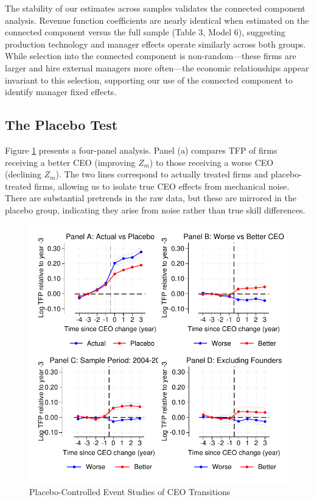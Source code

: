 \documentclass[11pt,a4paper]{article}
\begin{document}


The stability of our estimates across samples validates the connected component analysis. Revenue function coefficients are nearly identical when estimated on the connected component versus the full sample (Table 3, Model 6), suggesting production technology and manager effects operate similarly across both groups. While selection into the connected component is non-random—these firms are larger and hire external managers more often—the economic relationships appear invariant to this selection, supporting our use of the connected component to identify manager fixed effects.

\subsection{The Placebo Test}

Figure \ref{fig:event_study_main} presents a four-panel analysis. Panel (a) compares TFP of firms receiving a better CEO (improving $Z_m$) to those receiving a worse CEO (declining $Z_m$). The two lines correspond to actually treated firms and placebo-treated firms, allowing us to isolate true CEO effects from mechanical noise. There are substantial pretrends in the raw data, but these are mirrored in the placebo group, indicating they arise from noise rather than true skill differences.

\begin{figure}[htbp]
\centering
\includegraphics[width=\textwidth]{figure/event_study.pdf}
\caption{Placebo-Controlled Event Studies of CEO Transitions}
\label{fig:event_study_main}
\end{figure}
\end{document}
